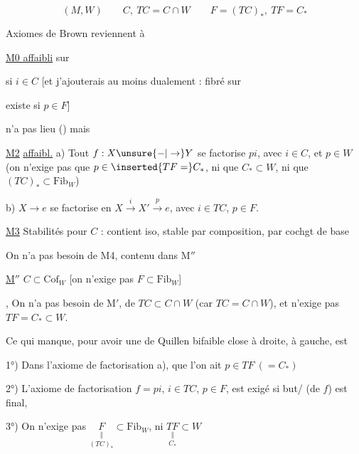 


\[ (M,W)\qquad C,\ TC=C\cap W\qquad F=(TC)_*,\ TF=C_* \]

Axiomes de Brown reviennent à

\uline{M0 affaibli} \quad {} sur


 si $i\in C$ [et j'ajouterais au moins \unsure{;} dualement :  fibré sur


existe si $p\in F$]

 n'a pas lieu () mais

\uline{M2} \uline{affaibl.} \quad a) Tout $f:X\unsure{-|\to}Y$ se factorise  $pi$, avec $i\in C$, et $p\in W$ (on n'exige pas que $p\in\inserted{TF=}C_*$, ni que $C_*\subset W$, ni que $(TC)_*\subset\mathrm{Fib}_W$)

b) $X\longrightarrow e$ se factorise en $X\xrightarrow{i}X'\xrightarrow{p}e$, avec $i\in TC$, $p\in F$.

\uline{M3} Stabilités pour $C$ : contient iso, stable par composition, par cochgt de base

 On n'a pas besoin de M4, contenu dans M$''$

\uline{M$''$} \quad $C\subset\mathrm{Cof}_W$ [on n'exige pas $F\subset\mathrm{Fib}_W$]

, On n'a pas besoin de M$'$, de $TC\subset C\cap W$ (car $TC=C\cap W$), et  n'exige pas $TF=C_*\subset W$.

Ce qui manque, pour avoir une   de Quillen bifaible close à droite,  à gauche, est


1°) Dans l'axiome de factorisation a), que l'on ait $p\in TF\ (=C_*)$

2°) L'axiome de factorisation $f=pi$, $i\in TC$, $p\in F$, est exigé  si but/ (de $f$) est final,

3°) On n'exige pas $\underset{(TC)_*}{\underset{\Vert}{F}}\subset\mathrm{Fib}_W$, ni $\underset{C_*}{\underset{\Vert}{TF}}\subset W$


